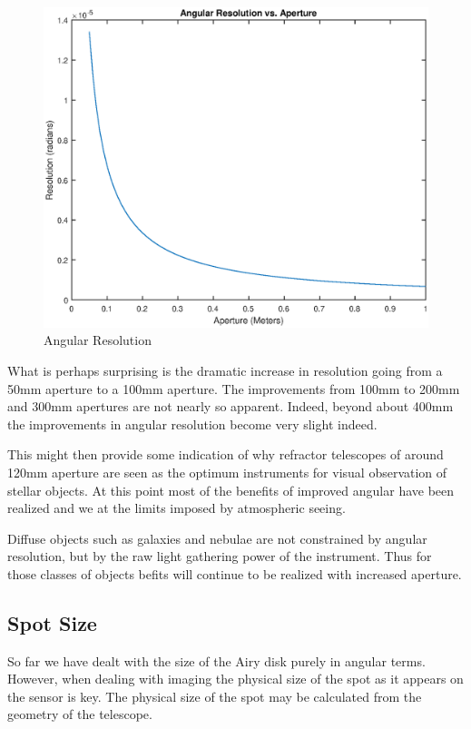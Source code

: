 \documentclass[11pt]{article}
\begin{document}
\bigskip
\begin{figure}[htb]
	\begin{center}
		\includegraphics[scale=0.7]{resolution.eps}
		\caption{Angular Resolution}
		\label{fig:resolution}
	\end{center}
\end{figure}

What is perhaps surprising is the dramatic increase in resolution going from a 50mm aperture to a 100mm aperture. The improvements from 100mm to 200mm and 300mm apertures are not nearly so apparent.  Indeed, beyond about 400mm the improvements in angular resolution become very slight indeed.

This might then provide some indication of why refractor telescopes of around 120mm aperture are seen as the optimum instruments for visual observation of stellar objects.  At this point most of the benefits of improved angular have been realized and we at the  limits imposed by atmospheric seeing.

Diffuse objects such as galaxies and nebulae are not constrained by angular resolution, but by the raw light gathering power of the instrument.  Thus for those classes of objects befits will continue to be realized with increased aperture.   


\subsection{Spot Size}
So far we have dealt with the size of the Airy disk purely in angular terms.  However, when dealing with imaging the physical size of the spot as it appears on the sensor is key.  The physical size of the spot may be calculated from the geometry of the telescope.  
\end{document}
